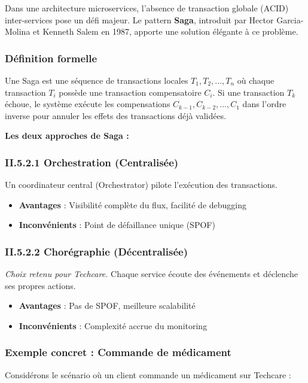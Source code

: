 Dans une architecture microservices, l'absence de transaction globale (ACID) inter-services pose un défi majeur. Le pattern \textbf{Saga}, introduit par Hector Garcia-Molina et Kenneth Salem en 1987, apporte une solution élégante à ce problème.

\subsubsection{Définition formelle}
Une Saga est une séquence de transactions locales $T_1, T_2, ..., T_n$ où chaque transaction $T_i$ possède une transaction compensatoire $C_i$. Si une transaction $T_k$ échoue, le système exécute les compensations $C_{k-1}, C_{k-2}, ..., C_1$ dans l'ordre inverse pour annuler les effets des transactions déjà validées.

\textbf{Les deux approches de Saga :}

\subsubsection{II.5.2.1 Orchestration (Centralisée)}
Un coordinateur central (Orchestrator) pilote l'exécution des transactions.
\begin{itemize}
    \item \textbf{Avantages} : Visibilité complète du flux, facilité de debugging
    \item \textbf{Inconvénients} : Point de défaillance unique (SPOF)
\end{itemize}

\subsubsection{II.5.2.2 Chorégraphie (Décentralisée)}
\textit{Choix retenu pour Techcare.} Chaque service écoute des événements et déclenche ses propres actions.
\begin{itemize}
    \item \textbf{Avantages} : Pas de SPOF, meilleure scalabilité
    \item \textbf{Inconvénients} : Complexité accrue du monitoring
\end{itemize}

\subsubsection{Exemple concret : Commande de médicament}

Considérons le scénario où un client commande un médicament sur Techcare :

